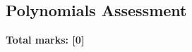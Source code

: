 \documentclass[../c1]{subfiles}
\begin{document}
\subsection*{Polynomials Assessment}
\thispagestyle{fancy}



\begin{flushright}
\textbf{Total marks: [0]}
\end{flushright}
\end{document}
